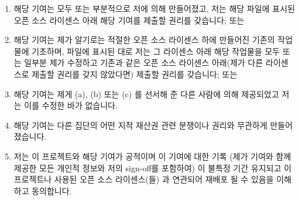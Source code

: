 \begin{enumerate}
\item	해당 기여는 모두 또는 부분적으로 저에 의해 만들어졌고, 저는 해당 파일에
	표시된 오픈 소스 라이센스 아래 해당 기여를 제출할 권리를 갖습니다; 또는

\iffalse
\item	The contribution was created in whole or in part
	by me and I have the right to submit it under
	the open source license indicated in the file; or
\fi

\item	해당 기여는 제가 알기로는 적절한 오픈 소스 라이센스 하에 만들어진
	기존의 작업물에 기초하며, 파일에 표시된 대로 저는 그 라이센스 아래 해당
	작업물을 모두 또는 일부분 제가 수정하고 기존과 같은 오픈 소스 라이센스
	아래(제가 다른 라이센스로 제출할 권리를 갖지 않았다면) 제출할 권리를
	갖습니다; 또는

\iffalse
\item	The contribution is based upon previous work
	that, to the best of my knowledge, is covered
	under an appropriate open source License and I
	have the right under that license to submit that
	work with modifications, whether created in whole
	or in part by me, under the same open source
	license (unless I am permitted to submit under
	a different license), as indicated in the file; or
\fi

\item	해당 기여는 제게 (a), (b) 또는 (c) 를 선서해 준 다른 사람에 의해
	제공되었고 저는 이를 수정한 바가 없습니다.

\iffalse
\item	The contribution was provided directly to me by
	some other person who certified (a), (b) or (c)
	and I have not modified it.
\fi

\item	해당 기여는 다른 집단의 어떤 지적 재산권 관련 분쟁이나 권리와 무관하게
	만들어졌습니다.

\iffalse
\item	The contribution is made free of any other party's
	intellectual property claims or rights.
\fi

\item	저는 이 프로젝트와 해당 기여가 공적이며 이 기여에 대한 기록 (제가
	기여와 함께 제공한 모든 개인적 정보와 저의 sign-off를 포함하여) 이
	불특정 기간 유지되고 이 프로젝트나 사용된 오픈 소스 라이센스(들) 과
	연관되어 재배포 될 수 있음을 이해하고 동의합니다.

\iffalse
\item	I understand and agree that this project and the
	contribution are public and that a record of the
	contribution (including all personal information
	I submit with it, including my sign-off) is
	maintained indefinitely and may be redistributed
	consistent with this project or the open source
	license(s) involved.
\fi
\end{enumerate}

